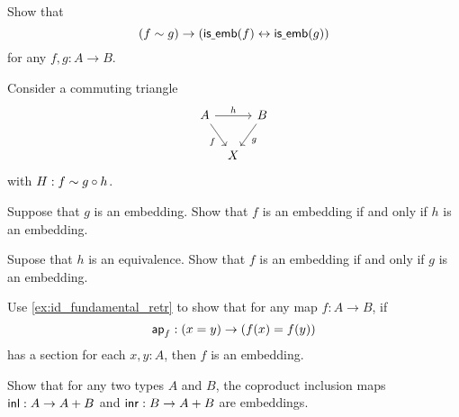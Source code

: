 \begin{exercises}
\item Show that 
\begin{equation*}
(f\sim g)\to (\mathsf{is\underline{\ }{}emb}(f)\leftrightarrow\mathsf{is\underline{\ }{}emb}(g))
\end{equation*}
for any $f,g:A\to B$.
\item \label{ex:emb_triangle}Consider a commuting triangle
\begin{equation*}
\begin{tikzcd}[column sep=tiny]
A \arrow[rr,"h"] \arrow[dr,swap,"f"] & & B \arrow[dl,"g"] \\
& X
\end{tikzcd}
\end{equation*}
with $H:f\sim g\circ h$. 
\begin{subexenum}
\item Suppose that $g$ is an embedding. Show that $f$ is an embedding if and only if $h$ is an embedding.
\item Supose that $h$ is an equivalence. Show that $f$ is an embedding if and only if $g$ is an embedding.
\end{subexenum}
\item Use \cref{ex:id_fundamental_retr} to show that for any map $f:A\to B$, if
\begin{equation*}
\mathsf{ap}_{f} : (x=y) \to (f(x)=f(y))
\end{equation*}
has a section for each $x,y:A$, then $f$ is an embedding.
\item Show that for any two types $A$ and $B$, the coproduct inclusion maps ${\mathsf{inl}}:A \to A + B$ and ${\mathsf{inr}} : B \to A + B$ are embeddings.
\begin{comment}
\item \label{ex:eqv_sigma_mv}Consider a map
\begin{equation*}
f:A \to \sm{y:B}C(y).
\end{equation*}
\begin{subexenum}
\item Construct a fiberwise transformation
\begin{equation*}
f':\prd{y:B} \fib{\proj 1\circ f}{y}\to C(y).
\end{equation*}
\item Construct an equivalence
\begin{equation*}
\eqv{\fib{f'(b)}{c}}{\fib{f}{(b,c)}}
\end{equation*}
for every $(b,c):\sm{y:B}C(y)$.
\item Conclude that the following are equivalent:
\begin{enumerate}

\end{comment}
\end{exercises}
